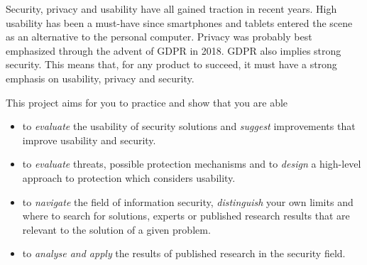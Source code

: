 Security, privacy and usability have all gained traction in recent years.
High usability has been a must-have since smartphones and tablets entered the 
scene as an alternative to the personal computer.
Privacy was probably best emphasized through the advent of \ac{GDPR} in 2018.
\Ac{GDPR} also implies strong security.
This means that, for any product to succeed, it must have a strong emphasis on 
usability, privacy and security.

This project aims for you to practice and show that you are able
\begin{itemize}
  \item to \emph{evaluate} the usability of security solutions and 
    \emph{suggest} improvements that improve usability and security.
  \item to \emph{evaluate} threats, possible protection mechanisms and to 
    \emph{design} a high-level approach to protection which considers 
    usability.
  \item to \emph{navigate} the field of information security, 
    \emph{distinguish} your own limits and where to search for solutions, \eg 
    experts or published research results that are relevant to the solution of 
    a given problem.
  \item to \emph{analyse and apply} the results of published research in the 
    security field.
\end{itemize}
